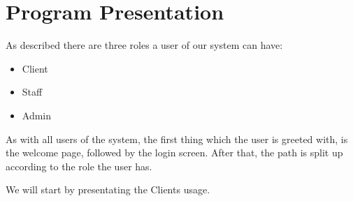 \chapter{Program Presentation}
\label{chap:program_presentation}

As described there are three roles a user of our system can have:

\begin{itemize}
	\item Client
	\item Staff
	\item Admin
\end{itemize}

As with all users of the system, the first thing which the user is greeted with, is the welcome page, followed by the login screen.
After that, the path is split up according to the role the user has. 

We will start by presentating the Clients usage.






